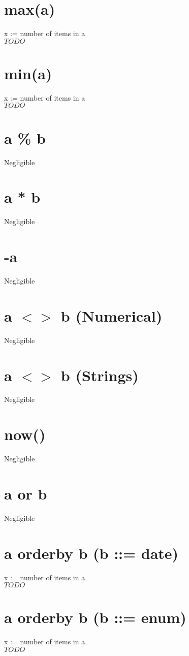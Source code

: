 \documentclass[12pt]{article}
\begin{document}
	\section{max(a)}
	x := number of items in a\\
	$TODO$
	
	\section{min(a)}
	x := number of items in a\\
	$TODO$
	
	\section{a \% b}
	Negligible
	
	\section{a * b}
	Negligible
	
	\section{-a}
	Negligible
	
	\section{a $<>$ b (Numerical)}
	Negligible
	
	\section{a $<>$ b (Strings)}
	Negligible
	
	\section{now()}
	Negligible
	
	\section{a or b}
	Negligible
	
	\section{a orderby b (b ::= date)}
	x := number of items in a\\
	$TODO$
	
	\section{a orderby b (b ::= enum)}
	x := number of items in a\\
	$TODO$
	
\end{document}
